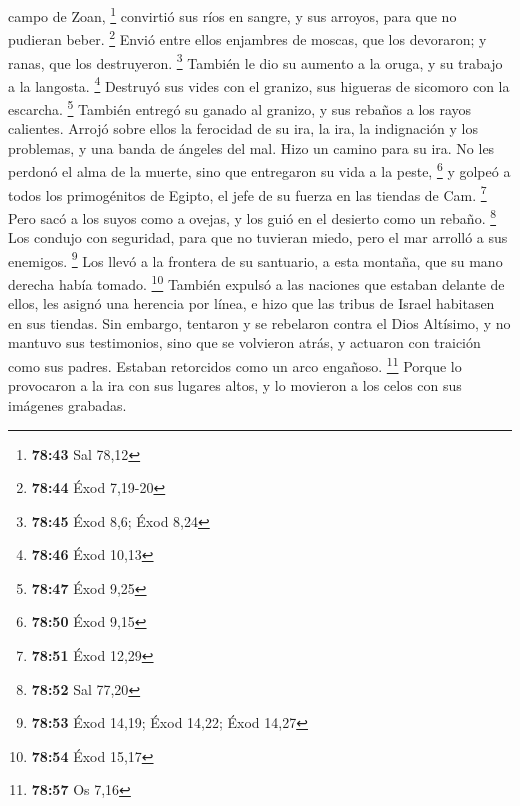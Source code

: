 \begin{paracol}{2}
campo de Zoan, \footnote{\textbf{78:43} Sal 78,12} 
convirtió sus ríos en sangre, y sus arroyos, para que no pudieran beber.
\footnote{\textbf{78:44} Éxod 7,19-20}  Envió entre ellos
enjambres de moscas, que los devoraron; y ranas, que los destruyeron.
\footnote{\textbf{78:45} Éxod 8,6; Éxod 8,24}  También le
dio su aumento a la oruga, y su trabajo a la langosta. \footnote{\textbf{78:46}
  Éxod 10,13}  Destruyó sus vides con el granizo, sus
higueras de sicomoro con la escarcha. \footnote{\textbf{78:47} Éxod 9,25}
 También entregó su ganado al granizo, y sus rebaños a
los rayos calientes.  Arrojó sobre ellos la ferocidad de
su ira, la ira, la indignación y los problemas, y una banda de ángeles
del mal.  Hizo un camino para su ira. No les perdonó el
alma de la muerte, sino que entregaron su vida a la peste, \footnote{\textbf{78:50}
  Éxod 9,15}  y golpeó a todos los primogénitos de
Egipto, el jefe de su fuerza en las tiendas de Cam. \footnote{\textbf{78:51}
  Éxod 12,29}  Pero sacó a los suyos como a ovejas, y los
guió en el desierto como un rebaño. \footnote{\textbf{78:52} Sal 77,20}
 Los condujo con seguridad, para que no tuvieran miedo,
pero el mar arrolló a sus enemigos. \footnote{\textbf{78:53} Éxod 14,19;
  Éxod 14,22; Éxod 14,27}  Los llevó a la frontera de su
santuario, a esta montaña, que su mano derecha había tomado. \footnote{\textbf{78:54}
  Éxod 15,17}  También expulsó a las naciones que estaban
delante de ellos, les asignó una herencia por línea, e hizo que las
tribus de Israel habitasen en sus tiendas.  Sin embargo,
tentaron y se rebelaron contra el Dios Altísimo, y no mantuvo sus
testimonios,  sino que se volvieron atrás, y actuaron con
traición como sus padres. Estaban retorcidos como un arco engañoso.
\footnote{\textbf{78:57} Os 7,16}  Porque lo provocaron a
la ira con sus lugares altos, y lo movieron a los celos con sus imágenes
grabadas.

\end{paracol}
